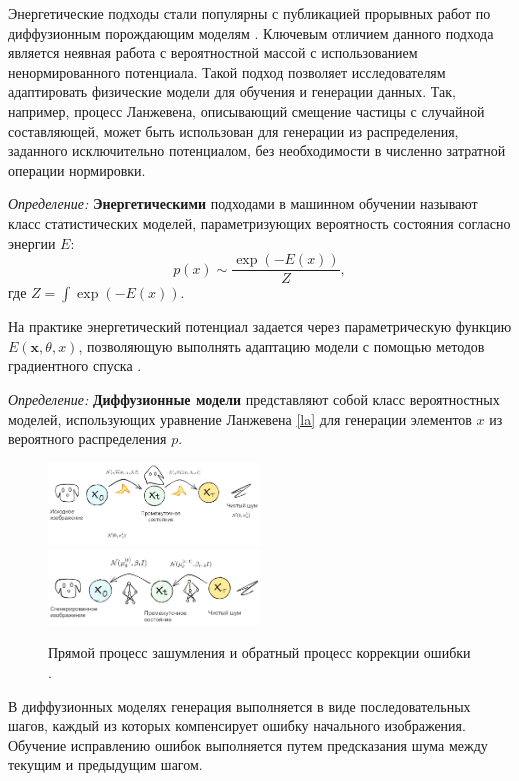 Энергетические подходы стали популярны с публикацией прорывных работ по диффузионным порождающим 
моделям \cite{song2020score}. Ключевым отличием данного подхода является неявная работа с вероятностной
массой с использованием ненормированного потенциала. Такой подход позволяет исследователям адаптировать
физические модели для обучения и генерации данных. Так, например, процесс Ланжевена, описывающий
смещение частицы с случайной составляющей, может быть использован для генерации из распределения, заданного
исключительно потенциалом, без необходимости в численно затратной операции нормировки.

\textit{Определение:} \textbf{Энергетическими} подходами в машинном обучении 
называют класс статистических моделей, параметризующих вероятность 
состояния согласно энергии $E$:
\begin{equation}
    p(x) \sim \frac{\exp(-E(x))}{Z},
\end{equation}
где $Z=\int \exp(-E(x))$. 

На практике энергетический потенциал задается через параметрическую функцию $E(\mathbf{x},\theta,x)$, позволяющую
выполнять адаптацию модели с помощью методов градиентного спуска \cite{lecun2006tutorial}.

\textit{Определение:} \textbf{Диффузионные модели} \label{diffusion} представляют собой класс вероятностных моделей, 
использующих уравнение Ланжевена \ref{la} для генерации элементов $x$ из вероятного распределения $p$.

\begin{figure}[h]
    \centering
    \includegraphics[width=0.5\textwidth]{assets/ml/generation/diffusion_1.excalidraw.png}
    \includegraphics[width=0.5\textwidth]{assets/ml/generation/diffusion_2.excalidraw.png}
    \caption{Прямой процесс зашумления и обратный процесс коррекции ошибки \cite{stablediffusion}.}
    \label{sd_arch}
\end{figure}

В диффузионных моделях генерация выполняется в виде последовательных шагов, каждый из которых 
компенсирует ошибку начального изображения. Обучение исправлению ошибок выполняется путем предсказания 
шума между текущим и предыдущим шагом.


